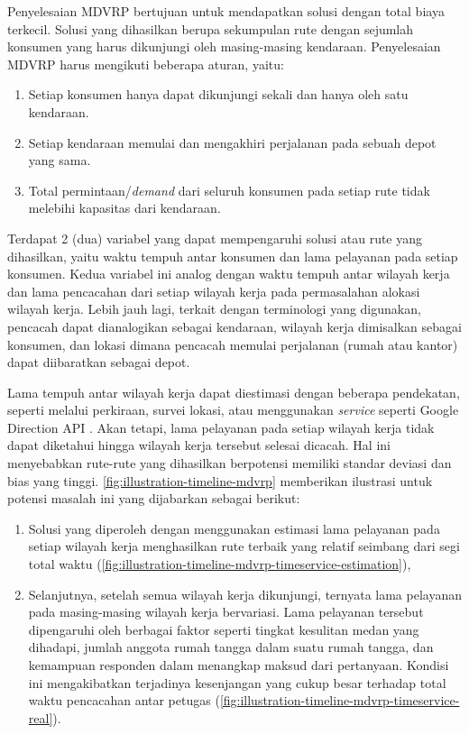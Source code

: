 Penyelesaian MDVRP bertujuan untuk mendapatkan solusi dengan total biaya terkecil. Solusi yang dihasilkan berupa sekumpulan rute dengan sejumlah konsumen yang harus dikunjungi oleh masing-masing kendaraan. Penyelesaian MDVRP harus mengikuti beberapa aturan, yaitu:

\begin{enumerate}
	\item Setiap konsumen hanya dapat dikunjungi sekali dan hanya oleh satu kendaraan. 
	\item Setiap kendaraan memulai dan mengakhiri perjalanan pada sebuah depot yang sama. 
	\item Total permintaan/\textit{demand} dari seluruh konsumen pada setiap rute tidak melebihi kapasitas dari kendaraan.
\end{enumerate}

Terdapat 2 (dua) variabel yang dapat mempengaruhi solusi atau rute yang dihasilkan, yaitu waktu tempuh antar konsumen dan lama pelayanan pada setiap konsumen. Kedua variabel ini analog dengan waktu tempuh antar wilayah kerja dan lama pencacahan dari setiap wilayah kerja pada permasalahan alokasi wilayah kerja. Lebih jauh lagi, terkait dengan terminologi yang digunakan, pencacah dapat dianalogikan sebagai kendaraan, wilayah kerja dimisalkan sebagai konsumen, dan lokasi dimana pencacah memulai perjalanan (rumah atau kantor) dapat diibaratkan sebagai depot.

Lama tempuh antar wilayah kerja dapat diestimasi dengan beberapa pendekatan, seperti melalui perkiraan, survei lokasi, atau menggunakan \textit{service} seperti Google Direction API \citep{google_google_2016}. Akan tetapi, lama pelayanan pada setiap wilayah kerja tidak dapat diketahui hingga wilayah kerja tersebut selesai dicacah. Hal ini menyebabkan rute-rute yang dihasilkan berpotensi memiliki standar deviasi dan bias yang tinggi. \autoref{fig:illustration-timeline-mdvrp} memberikan ilustrasi untuk potensi masalah ini yang dijabarkan sebagai berikut:

\begin{enumerate}
	\item Solusi yang diperoleh dengan menggunakan estimasi lama pelayanan pada setiap wilayah kerja menghasilkan rute terbaik yang relatif seimbang dari segi total waktu (\autoref{fig:illustration-timeline-mdvrp-timeservice-estimation}), 
	\item Selanjutnya, setelah semua wilayah kerja dikunjungi, ternyata lama pelayanan pada masing-masing wilayah kerja bervariasi. Lama pelayanan tersebut dipengaruhi oleh berbagai faktor seperti tingkat kesulitan medan yang dihadapi, jumlah anggota rumah tangga dalam suatu rumah tangga, dan kemampuan responden dalam menangkap maksud dari pertanyaan. Kondisi ini mengakibatkan terjadinya kesenjangan yang cukup besar terhadap total waktu pencacahan antar petugas (\autoref{fig:illustration-timeline-mdvrp-timeservice-real}).
\end{enumerate}


